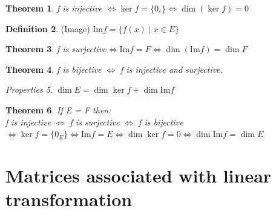 \documentclass{article}
\newtheorem{theorem}{Theorem}[section] %
\theoremstyle{definition}
\newtheorem{definition}[theorem]{Definition}
\theoremstyle{remark}
\newtheorem{prop}[theorem]{Properties}
\numberwithin{equation}{section}
\begin{document}
\begin{theorem}
    f is injective \(\iff \ker f = \{0_{e}\} \iff \dim{(\ker f)} = 0\)
\end{theorem}

\begin{definition} (Image)
    \(\mathrm{Im}f = \{f(x) \mid  x \in E\}\)
\end{definition}

\begin{theorem}
    f is surjective\(\iff \mathrm{Im}f = F \iff \dim{(\mathrm{Im} f)} = \dim{F}\) 
\end{theorem}

\begin{theorem}
    f is bijective \(\iff\) f is injective and surjective.
\end{theorem}

\begin{prop}
    \( \dim{E} = \dim{\ker f} + \dim{\mathrm{Im}f}\)

\end{prop}

\begin{theorem}
    If E = F then:\\
    f is injective 
    \(\iff\) f is surjective 
    \(\iff\) f is bijective
    \(\iff \ker{f} = \{0_{E}\}
    \iff \mathrm{Im}f = E
    \iff \dim{\ker{f}} = 0
    \iff \dim{\mathrm{Im}f} = \dim{E}\)
\end{theorem}






\section{Matrices associated with linear transformation}
\end{document}
